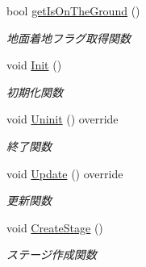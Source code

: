 \begin{DoxyCompactItemize}
bool \mbox{\hyperlink{class_stage_manager_a9681b6ab1d4c6b414bc81af515d1f20d}{get\+Is\+On\+The\+Ground}} ()
\begin{DoxyCompactList}\small\item\em 地面着地フラグ取得関数 \end{DoxyCompactList}\item 
void \mbox{\hyperlink{class_stage_manager_a6ee187d038d202439d696ff31b347226}{Init}} ()
\begin{DoxyCompactList}\small\item\em 初期化関数 \end{DoxyCompactList}\item 
void \mbox{\hyperlink{class_stage_manager_ab36f48dee34ce481c585b1d96df26dce}{Uninit}} () override
\begin{DoxyCompactList}\small\item\em 終了関数 \end{DoxyCompactList}\item 
void \mbox{\hyperlink{class_stage_manager_a254173b565937107fdfe02c0871b3520}{Update}} () override
\begin{DoxyCompactList}\small\item\em 更新関数 \end{DoxyCompactList}\item 
void \mbox{\hyperlink{class_stage_manager_a5fae84b1ae2f986bb79cb73d90595e77}{Create\+Stage}} ()
\begin{DoxyCompactList}\small\item\em ステージ作成関数 \end{DoxyCompactList}\end{DoxyCompactItemize}
